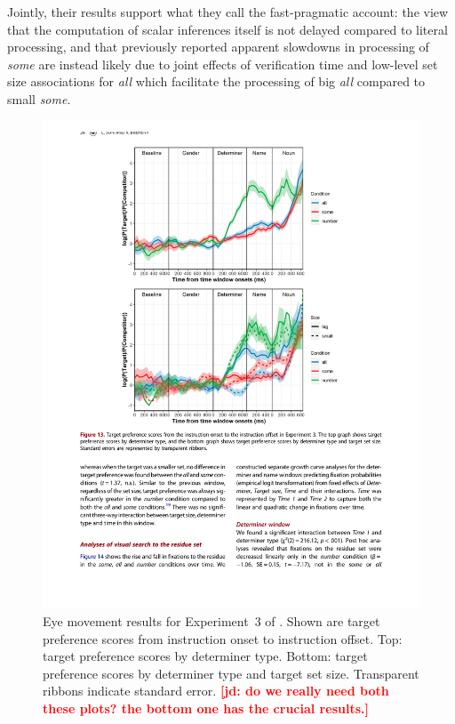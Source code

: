 \documentclass[10pt,letterpaper]{article}
\newcommand{\expref}[1]{Experiment~#1}
\newcommand{\jd}[1]{\textcolor{Red}{\textbf{[jd: #1]}}}
\begin{document}
Jointly, their results support what they call the fast-pragmatic account: the view that the computation of scalar inferences itself is not delayed compared to literal processing, and that previously reported apparent slowdowns in processing of \emph{some} are instead likely due to joint effects of verification time and low-level set size associations for \emph{all} which facilitate the processing of big \emph{all} compared to small \emph{some}. 


\begin{figure}
\centering
\includegraphics[width=\columnwidth]{images/results-original}
\caption{Eye movement results for \expref{3} of . Shown are target preference scores from instruction onset to instruction offset. Top: target preference scores by determiner type. Bottom: target preference scores by determiner type and target set size. Transparent ribbons indicate standard error. \jd{do we really need both these plots? the bottom one has the crucial results.}} 
\label{fig:results-original}
\end{figure}
\end{document}
